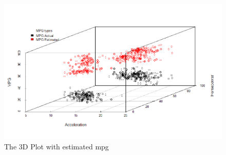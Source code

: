\documentclass[fontsize=10pt]{scrartcl}
\begin{document}
\begin{enumerate}
\begin{enumerate}
			\begin{figure}[H]
				\begin{center}
					\includegraphics[scale=.5]{resources/plot3d.png}
					\caption{The 3D Plot with estimated mpg}
				\end{center}
			\end{figure}
		\end{enumerate}
	\end{enumerate}
\end{document}
